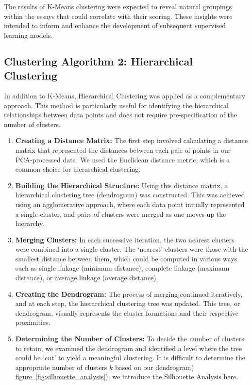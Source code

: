 \documentclass[8pt]{report}
\begin{document}
The results of K-Means clustering were expected to reveal natural groupings within the essays that could correlate with their scoring. These insights were intended to inform and enhance the development of subsequent supervised learning models.
\subsection{Clustering Algorithm 2: Hierarchical Clustering}
In addition to K-Means, Hierarchical Clustering was applied as a complementary approach. This method is particularly useful for identifying the hierarchical relationships between data points and does not require pre-specification of the number of clusters. 

\begin{enumerate}
    \item \textbf{Creating a Distance Matrix:} The first step involved calculating a distance matrix that represented the distances between each pair of points in our PCA-processed data. We used the Euclidean distance metric, which is a common choice for hierarchical clustering.

    \item \textbf{Building the Hierarchical Structure:} Using this distance matrix, a hierarchical clustering tree (dendrogram) was constructed. This was achieved using an agglomerative approach, where each data point initially represented a single-cluster, and pairs of clusters were merged as one moves up the hierarchy.

    \item \textbf{Merging Clusters:} In each successive iteration, the two nearest clusters were combined into a single cluster. The ‘nearest’ clusters were those with the smallest distance between them, which could be computed in various ways such as single linkage (minimum distance), complete linkage (maximum distance), or average linkage (average distance).

    \item \textbf{Creating the Dendrogram:} The process of merging continued iteratively, and at each step, the hierarchical clustering tree was updated. This tree, or dendrogram, visually represents the cluster formations and their respective proximities.

    \item \textbf{Determining the Number of Clusters:} To decide the number of clusters to retain, we examined the dendrogram and identified a level where the tree could be ‘cut’ to yield a meaningful clustering. It is difficult to determine the appropriate number of clusters \( k \) based on our dendrogram( \hyperref[fig:silhouette_analysis]{figure~\ref*{fig:silhouette_analysis}}), we introduce the Silhouette Analysis here.
\end{enumerate}
\end{document}
